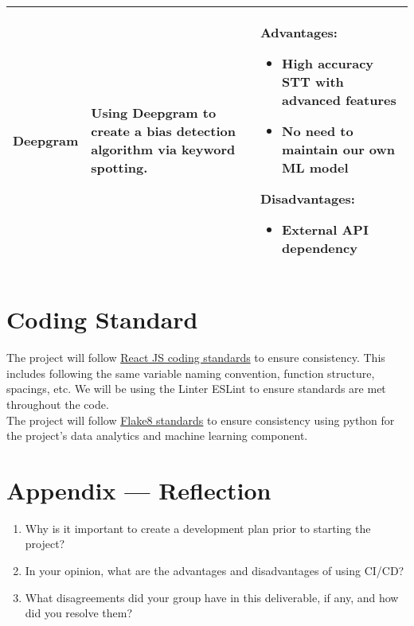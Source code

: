 \documentclass{article}
\begin{document}
\begin{table}[htbp]
\begin{tabularx}{\textwidth}{p{2cm} p{4cm} X}
  \textbf{Deepgram} 
  & Using Deepgram to create a bias detection algorithm via keyword spotting.
  & \textbf{Advantages:}
    \begin{itemize}
      \item High accuracy STT with advanced features
      \item No need to maintain our own ML model
    \end{itemize}
    \textbf{Disadvantages:}
    \begin{itemize}
      \item External API dependency
    \end{itemize}
  \\
  \bottomrule
  \end{tabularx}
\end{table}

\pagebreak

\section{Coding Standard}

The project will follow \href{https://github.com/pillarstudio/standards/blob/master/reactjs-guidelines.md}{React JS coding standards} to ensure consistency. This includes following the same variable naming convention, function structure, spacings, etc. We will be using the Linter ESLint to ensure standards are met throughout the code.\\
The project will follow \href{https://flake8.pycqa.org/en/latest/}{Flake8 standards} to ensure consistency using python for the project's data analytics and machine learning component. 

\newpage{}

\section*{Appendix --- Reflection}



\begin{enumerate}
    \item Why is it important to create a development plan prior to starting the
    project?
    \item In your opinion, what are the advantages and disadvantages of using
    CI/CD?
    \item What disagreements did your group have in this deliverable, if any,
    and how did you resolve them?
\end{enumerate}
\end{document}
